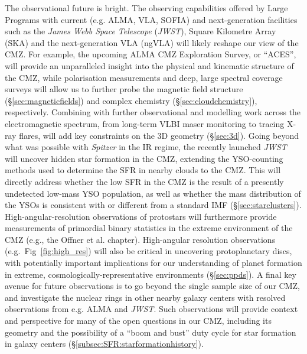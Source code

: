 The observational future is bright. 
The observing capabilities offered by Large Programs with current (e.g. ALMA, VLA, SOFIA) and next-generation facilities such as the {\em James Webb Space Telescope} ({\em JWST}), Square Kilometre Array (SKA) and the next-generation VLA (ngVLA) will likely reshape our view of the CMZ. 
For example, the upcoming ALMA CMZ Exploration Survey, or  ``ACES'', will provide an unparalleled insight into the physical and kinematic structure of the CMZ, while polarisation measurements and deep, large spectral coverage surveys will allow us to further probe the magnetic field structure (\S\ref{sec:magneticfields}) and complex chemistry (\S\ref{sec:cloudchemistry}), respectively.
Combining with further observational and modelling work across the electromagnetic spectrum, from long-term VLBI maser monitoring to tracing X-ray flares, will add key constraints on the 3D geometry (\S\ref{sec:3d}).
Going beyond what was possible with {\it Spitzer} in the IR regime, the recently launched {\em JWST} will uncover hidden star formation in the CMZ, extending the YSO-counting methods used to determine the SFR in nearby clouds to the CMZ. 
This will directly address whether the low SFR in the CMZ is the result of a presently undetected low-mass YSO population, as well as whether the mass distribution of the YSOs is consistent with or different from a standard IMF (\S\ref{sec:starclusters}). 
High-angular-resolution observations of protostars will furthermore provide measurements of primordial binary statistics in the extreme environment of the CMZ (e.g., the Offner et al. chapter).
High-angular resolution observations (e.g.\ Fig~\ref{fig:high_res}) will also be critical in uncovering protoplanetary discs, with potentially important implications for our understanding of planet formation in extreme, cosmologically-representative environments (\S\ref{sec:ppds}).
A final key avenue for future observations is to go beyond the single sample size of our CMZ, and investigate the nuclear rings in other nearby galaxy centers with resolved observations from e.g. ALMA and {\em JWST}. 
Such observations will provide context and perspective for many of the open questions in our CMZ, including its geometry and the possibility of a ``boom and bust'' duty cycle for star formation in galaxy centers (\S\ref{subsec:SFR:starformationhistory}).

